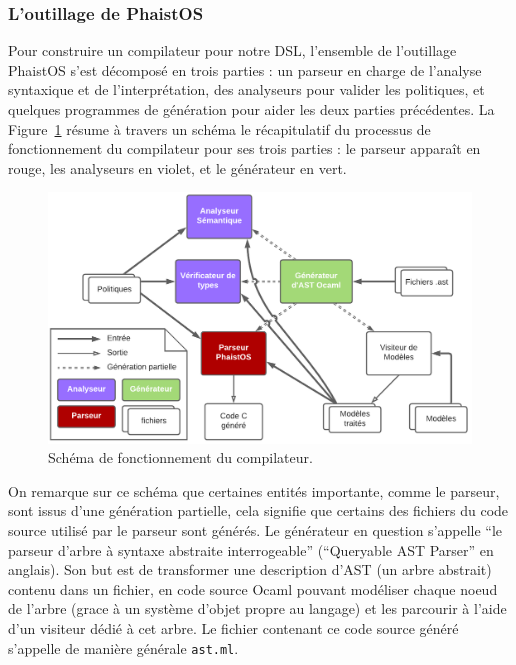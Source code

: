 \subsubsection{L'outillage de PhaistOS}

Pour construire un compilateur pour notre DSL, l'ensemble de l'outillage 
PhaistOS s'est décomposé en trois parties : un parseur en charge de l'analyse 
syntaxique et de l'interprétation, des analyseurs pour valider les politiques, 
et quelques programmes de génération pour aider les deux parties précédentes. 
La Figure~\ref{fig:compiler} résume à travers un schéma le récapitulatif du 
processus de fonctionnement du compilateur pour ses trois parties : le parseur 
apparaît en rouge, les analyseurs en violet, et le générateur en vert.

\begin{figure}[h!t] \centering
    \includegraphics[width=\textwidth]{images/compiler}
    \caption{Schéma de fonctionnement du compilateur.}
    \label{fig:compiler}
\end{figure}

\label{ast_files}

On remarque sur ce schéma que certaines entités importante, comme le parseur, 
sont issus d'une génération partielle, cela signifie que certains des fichiers 
du code source utilisé par le parseur sont générés. Le générateur en question 
s'appelle ``le parseur d'arbre à syntaxe abstraite interrogeable'' (``Queryable 
AST Parser'' en anglais). Son but est de transformer une description d'AST (un 
arbre abstrait) contenu dans un fichier, en code source Ocaml pouvant modéliser 
chaque noeud de l'arbre (grace à un système d'objet propre au langage) et les 
parcourir à l'aide d'un visiteur dédié à cet arbre. Le fichier contenant ce 
code source généré s'appelle de manière générale \texttt{ast.ml}.

